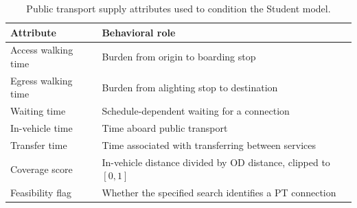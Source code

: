 \begin{table}[pos=htbp]
\centering\small
\caption{Public transport supply attributes used to condition the Student model.}
\label{tab:supply_features}
\begin{tabularx}{\textwidth}{@{}lX@{}}
\toprule
Attribute & Behavioral role \\
\midrule
Access walking time & Burden from origin to boarding stop \\
Egress walking time & Burden from alighting stop to destination \\
Waiting time & Schedule-dependent waiting for a connection \\
In-vehicle time & Time aboard public transport \\
Transfer time & Time associated with transferring between services \\
Coverage score & In-vehicle distance divided by OD distance, clipped to $[0,1]$ \\
Feasibility flag & Whether the specified search identifies a PT connection \\
\bottomrule
\end{tabularx}
\end{table}